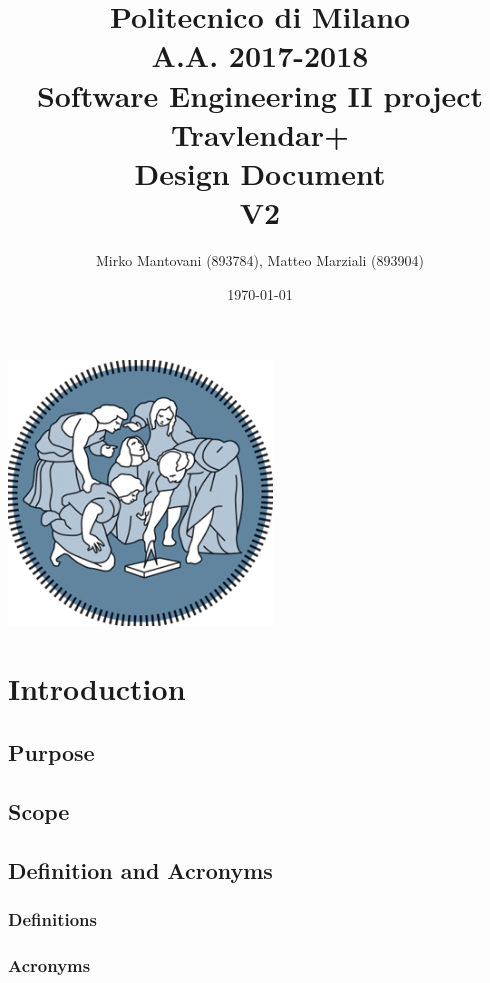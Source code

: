 \documentclass{article}
\author{Mirko Mantovani (893784), Matteo Marziali (893904)}
\date{\today}
\title{Politecnico di Milano
	\\A.A. 2017\@-\@2018
	\\Software Engineering II project \\ \textbf{Travlendar+}
	\\
	\textbf{D}esign \textbf{D}ocument 
	\\
	\textbf{V2}}
\begin{document}
\maketitle
\begin{center}
	\includegraphics[width=7cm]{polimi-logo}
\end{center}
\clearpage
{\hypersetup{hidelinks}\tableofcontents}
\clearpage

\section{Introduction}

\subsection{Purpose}



\subsection{Scope}




\clearpage

\subsection{Definition and Acronyms}

\subsubsection{Definitions}


\subsubsection{Acronyms}

\end{document}
